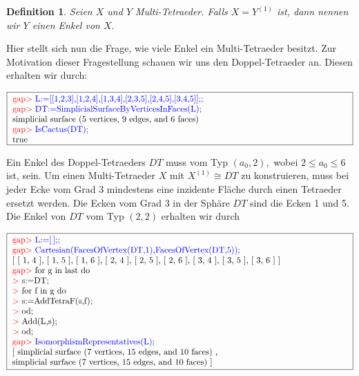\documentclass[12pt,titlepage,twoside,cleardoublepage]{article}
\theoremstyle{nummermitklammern}
\newtheorem{definition}[temp]{Definition}
\newtheorem{definition}[zahl]{Definition}
\numberwithin{equation}{section}
\begin{document}
\begin{definition}
Seien $X$ und $Y$ Multi-Tetraeder. Falls $X=Y^{(1)}$ ist, dann nennen wir $Y$ einen \emph{Enkel}  von $X.$ 
\end{definition}

Hier stellt sich nun die Frage, wie viele Enkel ein Multi-Tetraeder besitzt. 
Zur Motivation dieser Fragestellung schauen wir uns den Doppel-Tetraeder an.
Diesen erhalten wir durch:
\begin{center}
 $\fbox{
\parbox{14cm}{
\textcolor{red}{gap$>$} \textcolor{blue}{L:=[[1,2,3],[1,2,4],[1,3,4],[2,3,5],[2,4,5],[3,4,5]];;}\newline
\textcolor{red}{gap$>$} \textcolor{blue}{DT:=SimplicialSurfaceByVerticesInFaces(L);}\newline
simplicial surface (5 vertices, 9 edges, and 6 faces)\newline
\textcolor{red}{gap$>$} \textcolor{blue}{IsCactus(DT);}\newline
true
}}$
\end{center}
Ein Enkel des Doppel-Tetraeders $DT$ muss vom Typ $(a_0,2),$ wobei $2\leq a_0 \leq 6$ ist, sein.
Um einen Multi-Tetraeder $X$ mit $X^{(1)}\cong DT$ zu konstruieren, muss bei jeder Ecke vom Grad 3 mindestens eine inzidente Fläche durch einen Tetraeder ersetzt werden. Die Ecken vom Grad 3 in der Sphäre $DT$ sind die Ecken 1 und 5. 
Die Enkel von $DT$ vom Typ $(2,2)$ erhalten wir durch
\begin{center}
 $\fbox{
\parbox{14cm}{
\textcolor{red}{gap$>$} \textcolor{blue}{L:=[\,];;}\newline
\textcolor{red}{gap$>$} \textcolor{blue}{Cartesian(FacesOfVertex(DT,1),FacesOfVertex(DT,5));}\newline
[ [ 1, 4 ], [ 1, 5 ], [ 1, 6 ], [ 2, 4 ], [ 2, 5 ], [ 2, 6 ], [ 3, 4 ],
  [ 3, 5 ], [ 3, 6 ] ]\newline
\textcolor{red}{gap$>$} for g in last do\newline
\textcolor{red}{$>$} s:=DT;\newline
\textcolor{red}{$>$} for f in g do\newline
\textcolor{red}{$>$} s:=AddTetraF(s,f);\newline
\textcolor{red}{$>$} od;\newline
\textcolor{red}{$>$} Add(L,s);\newline
\textcolor{red}{$>$} od;\newline
\textcolor{red}{gap$>$} \textcolor{blue}{IsomorphismRepresentatives(L);}\newline
[ simplicial surface (7 vertices, 15 edges, and 10 faces)
    ,\newline
  simplicial surface (7 vertices, 15 edges, and 10 faces)
 ]
 }}$
 \end{center}
\end{document}
